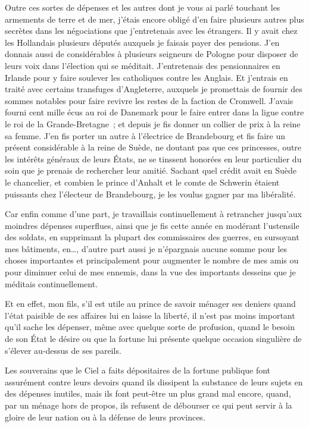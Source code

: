 \documentclass[french,twoside]{book} %
\begin{document}
Outre ces sortes de dépenses et les autres dont je vous ai parlé touchant les armements de terre et de mer, j’étais encore obligé d’en faire plusieurs autres plus secrètes dans les négociations que j’entretenais avec les étrangers. Il y avait chez les Hollandais plusieurs députés auxquels je faisais payer des pensions. J’en donnais aussi de considérables à plusieurs seigneurs de Pologne pour disposer de leurs voix dans l’élection qui se méditait. J’entretenais des pensionnaires en Irlande pour y faire soulever les catholiques contre les Anglais. Et j’entrais en traité avec certains transfuges d’Angleterre, auxquels je promettais de fournir des sommes notables pour faire revivre les restes de la faction de Cromwell. J’avais fourni cent mille écus au roi de Danemark pour le faire entrer dans la ligue contre le roi de la Grande-Bretagne ; et depuis je fis donner un collier de prix à la reine sa femme. J’en fis porter un autre à l’électrice de Brandebourg et fis faire un présent considérable à la reine de Suède, ne doutant pas que ces princesses, outre les intérêts généraux de leurs États, ne se tinssent honorées en leur particulier du soin que je prenais de rechercher leur amitié. Sachant quel crédit avait en Suède le chancelier, et combien le prince d’Anhalt et le comte de Schwerin étaient puissants chez l’électeur de Brandebourg, je les voulus gagner par ma libéralité.\par
Car enfin comme d’une part, je travaillais continuellement à retrancher jusqu’aux moindres dépenses superflues, ainsi que je fis cette année en modérant l’ustensile des soldats, en supprimant la plupart des commissaires des guerres, en sursoyant mes bâtiments, en…, d’autre part aussi je n’épargnais aucune somme pour les choses importantes et principalement pour augmenter le nombre de mes amis ou pour diminuer celui de mes ennemis, dans la vue des importants desseins que je méditais continuellement.\par
Et en effet, mon fils, s’il est utile au prince de savoir ménager ses deniers quand l’état paisible de ses affaires lui en laisse la liberté, il n’est pas moins important qu’il sache les dépenser, même avec quelque sorte de profusion, quand le besoin de son État le désire ou que la fortune lui présente quelque occasion singulière de s’élever au-dessus de ses pareils.\par
Les souverains que le Ciel a faits dépositaires de la fortune publique font assurément contre leurs devoirs quand ils dissipent la substance de leurs sujets en des dépenses inutiles, mais ils font peut-être un plus grand mal encore, quand, par un ménage hors de propos, ils refusent de débourser ce qui peut servir à la gloire de leur nation ou à la défense de leurs provinces.\par
\end{document}
